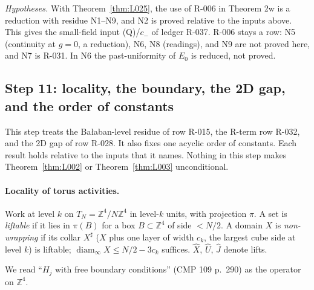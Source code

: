 \emph{Hypotheses.} With Theorem~\ref{thm:L025}, the use of R-006 in Theorem 2w is a reduction with residue N1--N9, and N2 is proved relative to the inputs above. This gives the small-field input (Q)/$c_-$ of ledger R-037. R-006 stays a row: N5 (continuity at $g=0$, a reduction), N6, N8 (readings), and N9 are not proved here, and N7 is R-031. In N6 the past-uniformity of $E_0$ is reduced, not proved.

\subsection{Step 11: locality, the boundary, the 2D gap, and the order of constants}\label{sec:src-r6}

This step treats the Ba{\l}aban-level residue of row R-015, the R-term row R-032, and the 2D gap of row R-028. It also fixes one acyclic order of constants. Each result holds relative to the inputs that it names. Nothing in this step makes Theorem~\ref{thm:L002} or Theorem~\ref{thm:L003} unconditional.

\paragraph{Locality of torus activities.} Work at level $k$ on $T_N=\mathbb Z^4/N\mathbb Z^4$ in level-$k$ units, with projection $\pi$. A set is \emph{liftable} if it lies in $\pi(B)$ for a box $B\subset\mathbb Z^4$ of side $<N/2$. A domain $X$ is \emph{non-wrapping} if its collar $X^\sharp$ ($X$ plus one layer of width $c_k$, the largest cube side at level $k$) is liftable; $\operatorname{diam}_\infty X\le N/2-3c_k$ suffices. $\hat X$, $\hat U$, $\hat J$ denote lifts.

\begin{convention}\label{conv:src-freebc}
We read ``$H_j$ with free boundary conditions'' (CMP 109 p.~290) as the operator on $\mathbb Z^4$.
\end{convention}

